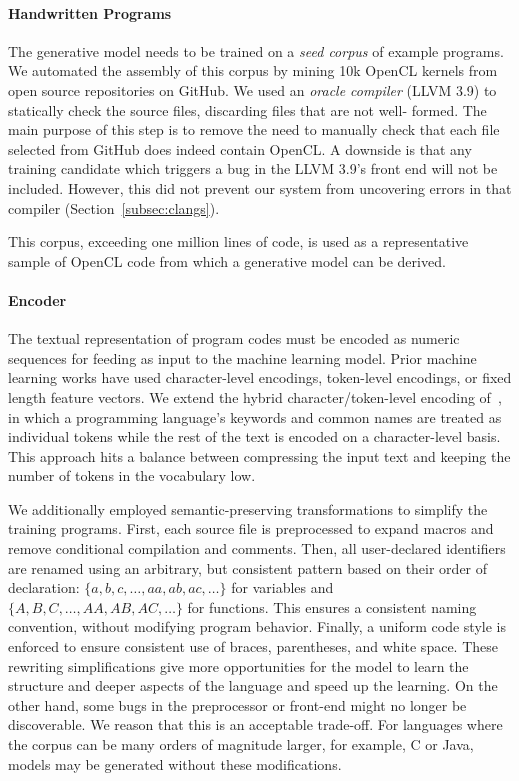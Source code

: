 \paragraph{Handwritten Programs}

The generative model needs to be trained on a \emph{seed corpus} of example
programs. We automated the assembly of this corpus by mining 10k OpenCL kernels
from open source repositories on GitHub. We used an \emph{oracle compiler} (LLVM
3.9) to statically check the source files, discarding files that are not well-
formed. The main purpose of this step is to remove the need to manually check
that each file selected from GitHub does indeed contain OpenCL. A downside is
that any training candidate which triggers a bug in the LLVM 3.9's front end
will not be included. However, this did not prevent our system from uncovering
errors in that compiler (Section~\ref{subsec:clangs}).

This corpus, exceeding one million lines of code, is used as a representative
sample of OpenCL code from which a generative model can be derived.

\paragraph{Encoder}

The textual representation of program codes must be encoded as numeric sequences
for feeding as input to the machine learning model. Prior machine learning works
have used character-level encodings, token-level encodings, or fixed length
feature vectors. We extend the hybrid character/token-level encoding
of~\cite{Cummins2017b}, in which a programming language's keywords and common
names are treated as individual tokens while the rest of the text is encoded on
a character-level basis. This approach hits a balance between compressing the
input text and keeping the number of tokens in the vocabulary low.

We additionally employed semantic-preserving transformations to simplify the
training programs. First, each source file is preprocessed to expand macros and
remove conditional compilation and comments. Then, all user-declared identifiers
are renamed using an arbitrary, but consistent pattern based on their order of
declaration: $\{a,\allowbreak b,\allowbreak c,\allowbreak \ldots,\allowbreak
aa,\allowbreak ab,\allowbreak ac,\allowbreak \ldots\}$ for variables and
$\{A,\allowbreak B,\allowbreak C,\allowbreak \ldots,\allowbreak AA,\allowbreak
AB,\allowbreak AC,\allowbreak \ldots\}$ for functions. This ensures a consistent
naming convention, without modifying program behavior. Finally, a uniform code
style is enforced to ensure consistent use of braces, parentheses, and white
space. These rewriting simplifications give more opportunities for the model to
learn the structure and deeper aspects of the language and speed up the
learning. On the other hand, some bugs in the preprocessor or front-end might no
longer be discoverable. We reason that this is an acceptable trade-off. For
languages where the corpus can be many orders of magnitude larger, for example,
C or Java, models may be generated without these modifications.

